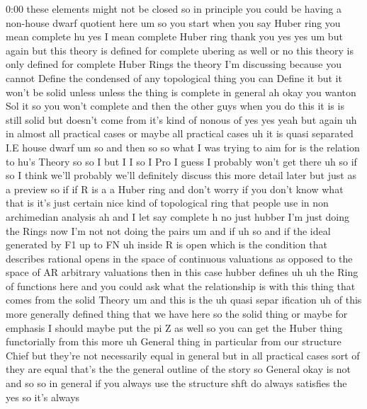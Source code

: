 \begin{unfinished}{0:00}
these  elements  might  not  be  closed  so  in
principle  you  could  be  having  a
non-house  dwarf  quotient  here  um  so  you
start  when  you  say  Huber  ring  you  mean
complete  hu  yes  I  mean  complete  Huber
ring  thank  you  yes  yes  um  but  again  but
this  theory  is  defined  for  complete
ubering  as  well  or  no  this  theory  is
only  defined  for  complete  Huber  Rings
the  theory  I'm  discussing  because  you
cannot  Define  the  condensed  of  any
topological  thing  you  can  Define  it  but
it  won't  be  solid  unless  unless  the
thing  is  complete  in  general  ah  okay  you
wanton  Sol  it  so  you  won't  complete  and
then  the  other  guys  when  you  do  this  it
is  is  still  solid  but  doesn't  come  from
it's  kind  of  nonous  of  yes
yes  yeah  but  again  uh  in  almost  all
practical  cases  or  maybe  all  practical
cases  uh  it  is  quasi
separated  I.E  house
dwarf
um  so  and  then  so  so  what  I  was  trying
to  aim  for  is  the  relation  to  hu's
Theory  so  so  I  but  I  I  so  I  Pro  I  guess
I  probably  won't  get  there
uh  so  if  so  I  think  we'll  probably  we'll
definitely  discuss  this  more  detail
later  but  just  as  a  preview  so  if  if  R
is  a  a  Huber  ring  and  don't  worry  if  you
don't  know  what  that  is  it's  just
certain  nice  kind  of  topological  ring
that  people  use  in  non  archimedian
analysis  ah  and  I  let  say  complete  h  no
just  hubber  I'm  just  doing  the  Rings  now
I'm  not  not  doing  the
pairs
um  and  if  uh  so  and  if  the  ideal
generated  by  F1  up  to  FN  uh  inside  R  is
open  which  is  the  condition  that
describes  rational  opens  in  the  space  of
continuous  valuations  as  opposed  to  the
space  of  AR  arbitrary  valuations  then  in
this  case  hubber
defines
uh  uh
the  Ring  of  functions
here  and  you  could  ask  what  the
relationship  is  with  this  thing  that
comes  from  the  solid  Theory  um  and  this
is  the  uh  quasi  separ
ification  uh  of  this  more  generally
defined  thing  that  we  have
here  so  the  solid  thing  or  maybe  for
emphasis  I  should  maybe  put  the  pi  Z  as
well  so  you  can  get  the  Huber  thing
functorially  from  this  more  uh  General
thing  in  particular  from  our  structure
Chief  but  they're  not  necessarily  equal
in  general  but  in  all  practical  cases
sort  of  they  are  equal  that's  the  the
general  outline  of  the
story  so
General  okay  is  not  and  so  so  in  general
if  you  always  use  the  structure  shft  do
always  satisfies  the  yes  so  it's  always

\end{unfinished}
